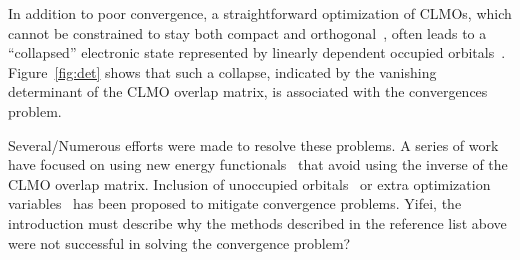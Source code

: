 \documentclass[aps,prl,twocolumn,reprint,amsmath,amssymb]{revtex4-1}
\begin{document}

In addition to poor convergence, a straightforward optimization of CLMOs, which cannot be constrained to stay both compact and orthogonal~\cite{stoll,ZZZ}, often leads to a ``collapsed'' electronic state represented by linearly dependent occupied orbitals~\cite{ordejon1995linear}. 
%
Figure~\ref{fig:det} shows that such a collapse, indicated by the vanishing determinant of the CLMO overlap matrix, is associated with 
the convergences problem. 

Several/Numerous efforts were made to resolve these problems. A series of work have focused on using new energy functionals~\cite{mauri1993orbital,kim1995total,ordejon1995linear} that avoid using the inverse of the CLMO overlap matrix. 
Inclusion of unoccupied orbitals~\cite{kim1995total} or extra optimization variables~\cite{burger2008linear,peng2013effective} has been proposed to mitigate convergence problems. 
\new Yifei, the introduction must describe why the methods described in the reference list above were not successful in solving the convergence problem? \old
\end{document}
